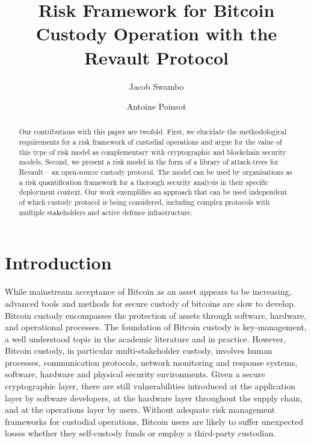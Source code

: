 \documentclass[runningheads]{llncs}
\begin{document}
\title{Risk Framework for Bitcoin Custody Operation with the Revault Protocol}

\author{Jacob Swambo \and
Antoine Poinsot}


\maketitle              %
\thispagestyle{fancy}

\begin{abstract}

Our contributions with this paper are twofold. First, we elucidate the methodological requirements for a risk framework of custodial operations and argue for the value of this type of risk model as complementary with cryptographic and blockchain security models. Second, we present a risk model in the form of a library of attack-trees for Revault -- an open-source custody protocol. The model can be used by organisations as a risk quantification framework for a thorough security analysis in their specific deployment context. Our work exemplifies an approach that can be used independent of which custody protocol is being considered, including complex protocols with multiple stakeholders and active defence infrastructure.

\end{abstract}

\section{Introduction}

While mainstream acceptance of Bitcoin as an asset appears to be increasing, advanced tools and methods for secure custody of bitcoins are slow to develop. Bitcoin custody encompasses the protection of assets through software, hardware, and operational processes. The foundation of Bitcoin custody is key-management, a well understood topic in the academic literature and in practice. However, Bitcoin custody, in particular multi-stakeholder custody, involves human processes, communication protocols, network monitoring and response systems, software, hardware and physical security environments. Given a secure cryptographic layer, there are still vulnerabilities introduced at the application layer by software developers, at the hardware layer throughout the supply chain, and at the operations layer by users. Without adequate risk management frameworks for custodial operations, Bitcoin users are likely to suffer unexpected losses whether they self-custody funds or employ a third-party custodian.  
\end{document}
